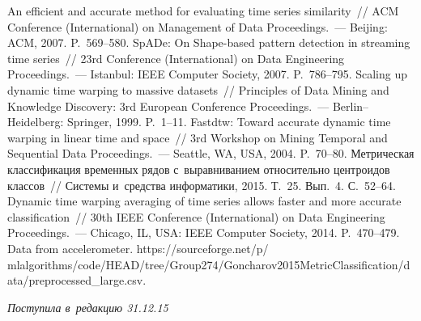 \begin{multicols}{2}
{{\begin{thebibliography}{99}
 An efficient and accurate method for evaluating 
time series similarity~// ACM  Conference (International) on Management of Data 
 Proceedings.~--- Beijing: ACM, 2007. P.~569--580.
SpADe: On Shape-based pattern detection in streaming time series~// 
23rd  Conference (International) on Data Engineering 
Proceedings.~--- Istanbul: IEEE Computer Society, 2007. P.~786--795.
 Scaling up dynamic time warping to massive datasets~// 
Principles of Data Mining and Knowledge Discovery:  3rd European Conference 
 Proceedings.~--- Berlin--Heidelberg: Springer, 1999. P.~1--11.
 Fastdtw: Toward accurate dynamic time warping in 
linear time and space~// 3rd Workshop on Mining Temporal and Sequential Data
Proceedings.~--- Seattle, WA, USA, 2004. P.~70--80.
Метрическая классификация временных рядов с~выравниванием относительно центроидов 
классов~// Системы и~средства информатики, 2015. Т.~25. Вып.~4. С.~52--64.
Dynamic time warping averaging of time series allows faster and more accurate 
classification~// 30th IEEE Conference (International) on Data Engineering
Proceedings.~--- 
Chicago, IL, USA: IEEE Computer Society, 2014. P.~470--479.
     Data from accelerometer. 
     {\sf https://sourceforge.net/p/\linebreak 
     mlalgorithms/code/HEAD/tree/Group274/Goncharov\linebreak 2015MetricClassification/data/preprocessed\_large.csv}.
     
     \end{thebibliography}

 }
 }

\end{multicols}

\vspace*{-3pt}

\hfill{\small\textit{Поступила в~редакцию 31.12.15}}


\newpage

\vspace*{-24pt}



